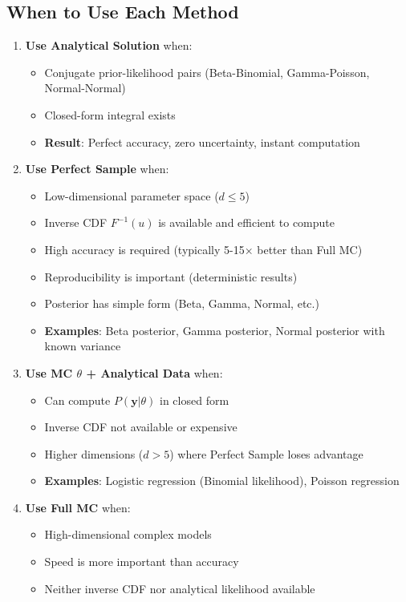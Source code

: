 \subsection{When to Use Each Method}
\begin{enumerate}
\item \textbf{Use Analytical Solution} when:
\begin{itemize}
\item Conjugate prior-likelihood pairs (Beta-Binomial, Gamma-Poisson, Normal-Normal)
\item Closed-form integral exists
\item \textbf{Result}: Perfect accuracy, zero uncertainty, instant computation
\end{itemize}
\item \textbf{Use Perfect Sample} when:
\begin{itemize}
\item Low-dimensional parameter space ($d \leq 5$)
\item Inverse CDF $F^{-1}(u)$ is available and efficient to compute
\item High accuracy is required (typically 5-15× better than Full MC)
\item Reproducibility is important (deterministic results)
\item Posterior has simple form (Beta, Gamma, Normal, etc.)
\item \textbf{Examples}: Beta posterior, Gamma posterior, Normal posterior with known variance
\end{itemize}
\item \textbf{Use MC $\theta$ + Analytical Data} when:
\begin{itemize}
\item Can compute $P(\mathbf{y}|\theta)$ in closed form
\item Inverse CDF not available or expensive
\item Higher dimensions ($d > 5$) where Perfect Sample loses advantage
\item \textbf{Examples}: Logistic regression (Binomial likelihood), Poisson regression
\end{itemize}
\item \textbf{Use Full MC} when:
\begin{itemize}
\item High-dimensional complex models
\item Speed is more important than accuracy
\item Neither inverse CDF nor analytical likelihood available

\end{itemize}
\end{enumerate}
